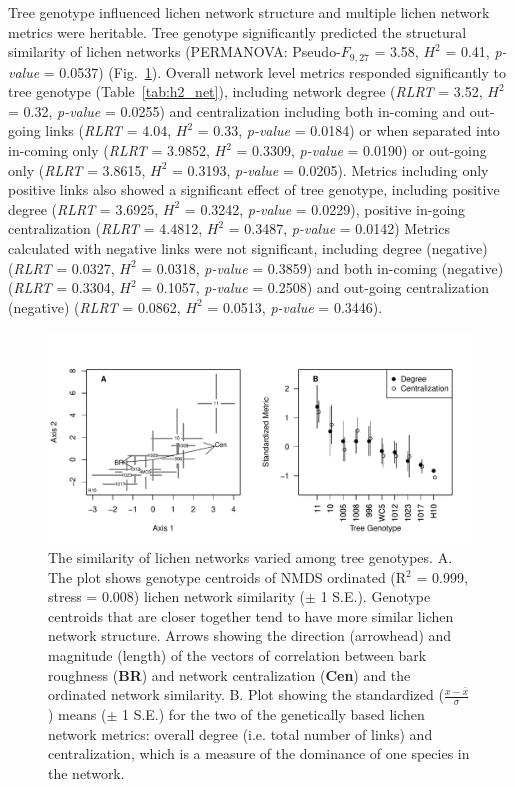 \documentclass[11pt,twocolumn,twoside,lineno]{pnas-new}
\begin{document}

Tree genotype influenced lichen network structure and multiple lichen
network metrics were heritable.  Tree genotype significantly predicted
the structural similarity of lichen networks (PERMANOVA:
Pseudo-$F_{9,27}$ = 3.58, $H^2$ = 0.41, \textit{p-value} = 0.0537)
(Fig.~\ref{fig:h2_plot}).  Overall network level metrics responded
significantly to tree genotype (Table~\ref{tab:h2_net}), including
network degree (\textit{RLRT} = 3.52, $H^2$ = 0.32, \textit{p-value} =
0.0255) and centralization including both in-coming and out-going
links (\textit{RLRT} = 4.04, $H^2$ = 0.33, \textit{p-value} = 0.0184)
or when separated into in-coming only (\textit{RLRT} = 3.9852, $H^2$ =
0.3309, \textit{p-value} = 0.0190) or out-going only (\textit{RLRT} =
3.8615, $H^2$ = 0.3193, \textit{p-value} = 0.0205).  Metrics including
only positive links also showed a significant effect of tree genotype,
including positive degree (\textit{RLRT} = 3.6925, $H^2$ = 0.3242,
\textit{p-value} = 0.0229), positive in-going centralization
(\textit{RLRT} = 4.4812, $H^2$ = 0.3487, \textit{p-value} = 0.0142)
Metrics calculated with negative links were not significant, including
degree (negative) (\textit{RLRT} = 0.0327, $H^2$ = 0.0318,
\textit{p-value} = 0.3859) and both in-coming (negative)
(\textit{RLRT} = 0.3304, $H^2$ = 0.1057, \textit{p-value} = 0.2508)
and out-going centralization (negative) (\textit{RLRT} = 0.0862, $H^2$
= 0.0513, \textit{p-value} = 0.3446).

\begin{figure}[ht]
\centering
\includegraphics[width=\linewidth]{h2_plot.pdf}
\caption{The similarity of lichen networks varied among tree
  genotypes. A. The plot shows genotype centroids of NMDS ordinated
  (R$^2$ = 0.999, stress = 0.008) lichen network similarity ($\pm$ 1
  S.E.). Genotype centroids that are closer together tend to have more
  similar lichen network structure. Arrows showing the direction
  (arrowhead) and magnitude (length) of the vectors of correlation
  between bark roughness (\textbf{BR}) and network centralization
  (\textbf{Cen}) and the ordinated network similarity. B. Plot showing
  the standardized ($\frac{x - \bar{x}}{\sigma}$) means ($\pm$ 1 S.E.)
  for the two of the genetically based lichen network metrics: overall
  degree (i.e. total number of links) and centralization, which is a
  measure of the dominance of one species in the network.}
\label{fig:h2_plot}
\end{figure}
\end{document}
